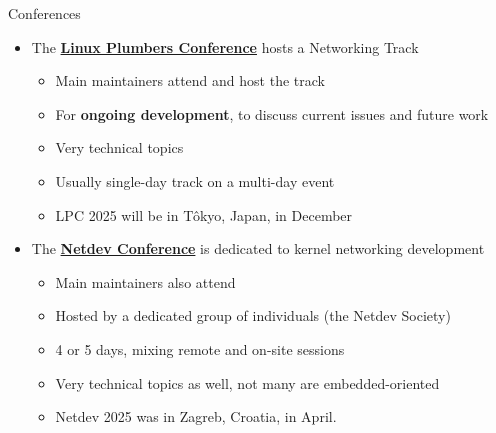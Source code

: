 \begin{frame}{Conferences}
	\begin{itemize}
		\item The \href{https://lpc.events/}{\textbf{Linux Plumbers Conference}} hosts a Networking Track
			\begin{itemize}
				\item Main maintainers attend and host the track
				\item For \textbf{ongoing development}, to discuss current issues and future work
				\item Very technical topics
				\item Usually single-day track on a multi-day event
				\item LPC 2025 will be in Tôkyo, Japan, in December
			\end{itemize}
		\item The \href{https://netdevconf.info/}{\textbf{Netdev Conference}} is dedicated to kernel networking development
			\begin{itemize}
				\item Main maintainers also attend
				\item Hosted by a dedicated group of individuals (the Netdev Society)
				\item 4 or 5 days, mixing remote and on-site sessions
				\item Very technical topics as well, not many are embedded-oriented
				\item Netdev 2025 was in Zagreb, Croatia, in April.
			\end{itemize}
	\end{itemize}
\end{frame}


